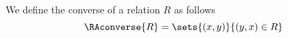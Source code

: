 \begin{definition}
\label{def:converse}
	We define the converse of a relation $R$ as follows
	\begin{equation*}
		\RAconverse{R} = \sets{(x,y)}{(y,x) \in R}
	\end{equation*}
\end{definition}